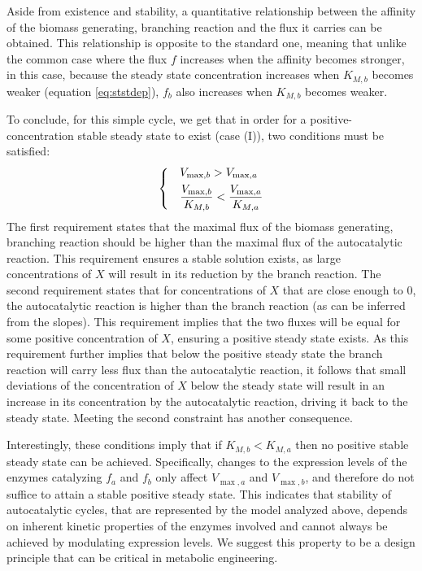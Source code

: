     Aside from existence and stability, a quantitative relationship between the affinity of the biomass generating, branching reaction and the flux it carries can be obtained.
    This relationship is opposite to the standard one, meaning that unlike the common case where the flux $f$ increases when the affinity becomes stronger, in this case, because the steady state concentration increases when $K_{M,b}$ becomes weaker (equation \ref{eq:ststdep}), $f_b$ also increases when $K_{M,b}$ becomes weaker.

    To conclude, for this simple cycle, we get that in order for a positive-concentration stable steady state to exist (case (I)), two conditions must be satisfied:
    \begin{equation}
    \label{eq:stabconds}
    \begin{dcases}
      & V_{\max,b}>V_{\max,a} \\
      & \frac{V_{\max,b}}{K_{M,b}}<\frac{V_{\max,a}}{K_{M,a}}
    \end{dcases}
    \end{equation}
    The first requirement states that the maximal flux of the biomass generating, branching reaction should be higher than the maximal flux of the autocatalytic reaction.
    This requirement ensures a stable solution exists, as large concentrations of $X$ will result in its reduction by the branch reaction.
    The second requirement states that for concentrations of $X$ that are close enough to $0$, the autocatalytic reaction is higher than the branch reaction (as can be inferred from the slopes).
    This requirement implies that the two fluxes will be equal for some positive concentration of $X$, ensuring a positive steady state exists.
    As this requirement further implies that below the positive steady state the branch reaction will carry less flux than the autocatalytic reaction, it follows that small deviations of the concentration of $X$ below the steady state will result in an increase in its concentration by the autocatalytic reaction, driving it back to the steady state.
    Meeting the second constraint has another consequence.

    Interestingly, these conditions imply that if $K_{M,b}<K_{M,a}$ then no positive stable steady state can be achieved.
    Specifically, changes to the expression levels of the enzymes catalyzing $f_a$ and $f_b$ only affect $V_{\max,a}$ and $V_{\max,b}$, and therefore do not suffice to attain a stable positive steady state.
    This indicates that stability of autocatalytic cycles, that are represented by the model analyzed above, depends on inherent kinetic properties of the enzymes involved and cannot always be achieved by modulating expression levels.
    We suggest this property to be a design principle that can be critical in metabolic engineering.

